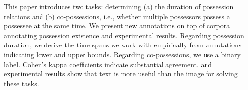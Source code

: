This paper introduces two tasks: determining (a) the duration of possession relations and (b) co-possessions, i.e., whether multiple possessors possess a possessee at the same time. We present new annotations on top of corpora annotating possession existence and experimental results. Regarding possession duration, we derive the time spans we work with empirically from annotations indicating lower and upper bounds. Regarding co-possessions, we use a binary label. Cohen's kappa coefficients indicate substantial agreement, and experimental results show that text is more useful than the image for solving these tasks.
